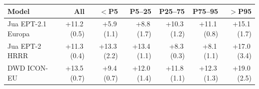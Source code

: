 \begin{tabular}{@{}lrrrrrr@{}}
\toprule
Model & All & $<$P5 & P5--25 & P25--75 & P75--95 & $>$P95 \\
\midrule
Jua EPT-2.1 Europa & +11.2\,(0.5) & +5.9\,(1.1) & +8.8\,(1.7) & +10.3\,(1.2) & +11.1\,(0.8) & +15.1\,(1.7) \\\addlinespace[0.35em]
Jua EPT-2 HRRR & +11.3\,(0.4) & +13.3\,(2.2) & +13.4\,(1.1) & +8.3\,(0.3) & +8.1\,(1.1) & +17.0\,(3.4) \\\addlinespace[0.35em]
DWD ICON-EU & +13.5\,(0.7) & +9.4\,(0.7) & +12.0\,(1.4) & +11.8\,(1.1) & +12.3\,(1.3) & +19.0\,(2.5) \\
\bottomrule
\end{tabular}
